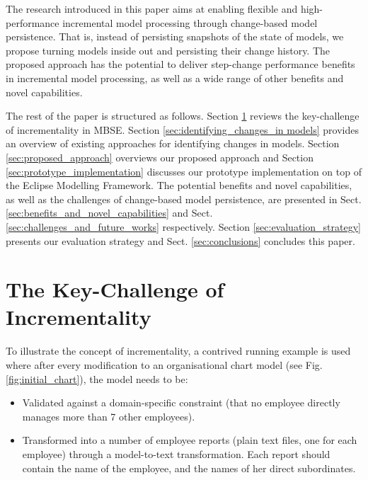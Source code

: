 The research introduced in this paper aims at enabling flexible and high-performance incremental model processing through change-based model persistence. That is, instead of persisting snapshots of the state of models, we propose turning models inside out and persisting their change history. The proposed approach has the potential to deliver step-change performance benefits in incremental model processing, as well as a wide range of other benefits and novel capabilities.

The rest of the paper is structured as follows. Section \ref{sec:the_key_challenge_of_ _incrementality} reviews the key-challenge of incrementality in MBSE. Section \ref{sec:identifying_changes_in models} provides an overview of existing approaches for identifying changes in models. Section \ref{sec:proposed_approach} overviews our proposed approach and Section \ref{sec:prototype_implementation} discusses our prototype implementation on top of the Eclipse Modelling Framework. The potential benefits and novel capabilities, as well as the challenges of change-based model persistence, are presented in Sect. \ref{sec:benefits_and_novel_capabilities} and Sect. \ref{sec:challenges_and_future_works} respectively. Section \ref{sec:evaluation_strategy} presents our evaluation strategy and Sect. \ref{sec:conclusions} concludes this paper.

\section{The Key-Challenge of Incrementality}
\label{sec:the_key_challenge_of_ _incrementality}
To illustrate the concept of incrementality, a contrived running example is used where after every modification to an organisational chart model (see Fig. \ref{fig:initial_chart}), the model needs to be:

\begin{itemize}
    \item Validated against a domain-specific constraint (that no employee directly manages more than 7 other employees).
    \item Transformed into a number of employee reports (plain text files, one for each employee) through a model-to-text transformation. Each report should contain the name of the employee, and the names of her direct subordinates.
\end{itemize}

